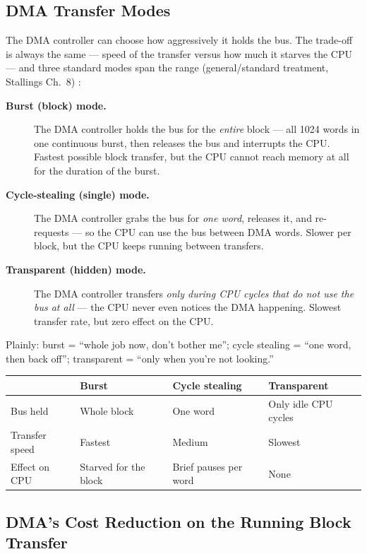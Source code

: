 \documentclass[11pt]{article}
\begin{document}
\subsection{DMA Transfer Modes}

The DMA controller can choose how aggressively it holds the bus. The trade-off is always the same --- speed of the transfer versus how much it starves the CPU --- and three standard modes span the range (general/standard treatment, Stallings Ch.~8) \cite{Stallings2015_computer_organization}:

\begin{description}
  \item[\textbf{Burst (block) mode.}] The DMA controller holds the bus for the \emph{entire} block --- all 1024 words in one continuous burst, then releases the bus and interrupts the CPU. Fastest possible block transfer, but the CPU cannot reach memory at all for the duration of the burst.
  \item[\textbf{Cycle-stealing (single) mode.}] The DMA controller grabs the bus for \emph{one word}, releases it, and re-requests --- so the CPU can use the bus between DMA words. Slower per block, but the CPU keeps running between transfers.
  \item[\textbf{Transparent (hidden) mode.}] The DMA controller transfers \emph{only during CPU cycles that do not use the bus at all} --- the CPU never even notices the DMA happening. Slowest transfer rate, but zero effect on the CPU.
\end{description}

Plainly: burst = ``whole job now, don't bother me''; cycle stealing = ``one word, then back off''; transparent = ``only when you're not looking.''

\begin{center}
\footnotesize
\begin{tabular}{@{}llll@{}}
\toprule
& \textbf{Burst} & \textbf{Cycle stealing} & \textbf{Transparent} \\
\midrule
Bus held & Whole block & One word & Only idle CPU cycles \\
Transfer speed & Fastest & Medium & Slowest \\
Effect on CPU & Starved for the block & Brief pauses per word & None \\
\bottomrule
\end{tabular}
\end{center}

\subsection{DMA's Cost Reduction on the Running Block Transfer}
\end{document}

